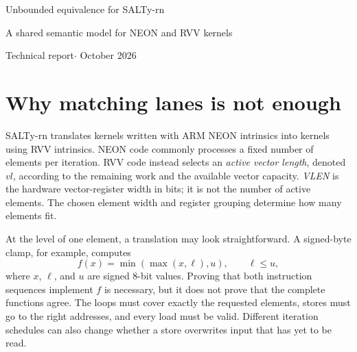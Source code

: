 \documentclass[11pt]{article}
\begin{document}
\thispagestyle{empty}
\begin{center}
{\sffamily\color{ink}\LARGE Unbounded equivalence for SALTy-rn\par}
\vspace{5pt}
{\large A shared semantic model for NEON and RVV kernels\par}
\vspace{7pt}
{\small Technical report\quad $\cdot$ October 2026}
\end{center}
\begin{abstract}
A SIMD translation can agree with its source on many tested sizes and still fail at a tail, an unusual shift count, or a different vector length. This report describes a Lean 4 framework for proving that complete NEON and RISC-V Vector (RVV) intrinsic kernels have the same observable behavior for every admitted call. Both programs execute in a shared byte-addressed model; independent termination and functional-correctness proofs connect them to one reference result. Loop induction removes the fixed execution bound used by the existing symbolic checks. The development establishes whole-function results for 11 of 36 implemented pairs and records 17 translation repairs, with separate evidence for each. The remaining 25 pairs are unproved; four absent or empty targets are excluded. The guarantees depend on explicit caller contracts and a trusted source-extraction bridge. They concern intrinsic C programs, not compiled binaries.
\end{abstract}

\section{Why matching lanes is not enough}
SALTy-rn translates kernels written with ARM NEON intrinsics into kernels using RVV intrinsics. NEON code commonly processes a fixed number of elements per iteration. RVV code instead selects an \emph{active vector length}, denoted $\mathit{vl}$, according to the remaining work and the available vector capacity. \emph{VLEN} is the hardware vector-register width in bits; it is not the number of active elements. The chosen element width and register grouping determine how many elements fit.

At the level of one element, a translation may look straightforward. A signed-byte clamp, for example, computes
\[
 f(x)=\min(\max(x,\ell),u),\qquad \ell\le u,
\]
where $x$, $\ell$, and $u$ are signed 8-bit values. Proving that both instruction sequences implement $f$ is necessary, but it does not prove that the complete functions agree. The loops must cover exactly the requested elements, stores must go to the right addresses, and every load must be valid. Different iteration schedules can also change whether a store overwrites input that has yet to be read.
\end{document}
